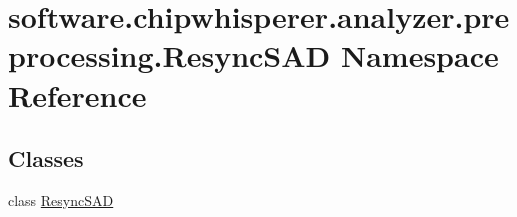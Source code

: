 \hypertarget{namespacesoftware_1_1chipwhisperer_1_1analyzer_1_1preprocessing_1_1ResyncSAD}{}\section{software.\+chipwhisperer.\+analyzer.\+preprocessing.\+Resync\+S\+A\+D Namespace Reference}
\label{namespacesoftware_1_1chipwhisperer_1_1analyzer_1_1preprocessing_1_1ResyncSAD}
\subsection*{Classes}
\begin{DoxyCompactItemize}
\item 
class \hyperlink{classsoftware_1_1chipwhisperer_1_1analyzer_1_1preprocessing_1_1ResyncSAD_1_1ResyncSAD}{Resync\+S\+A\+D}
\end{DoxyCompactItemize}
